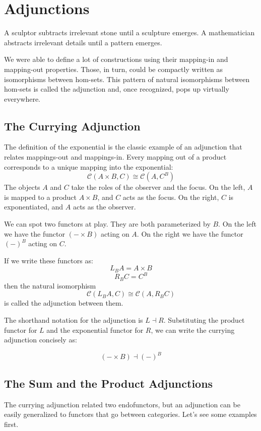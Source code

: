 \documentclass[DaoFP]{subfiles}
\begin{document}
\setcounter{chapter}{9}

\chapter{Adjunctions}

A sculptor subtracts irrelevant stone until a sculpture emerges. A mathematician abstracts irrelevant details until a pattern emerges.

We were able to define a lot of constructions using their mapping-in and mapping-out properties. Those, in turn, could be compactly written as isomorphisms between hom-sets. This pattern of natural isomorphisms between hom-sets is called the adjunction and, once recognized, pops up virtually everywhere.

\section{The Currying Adjunction}

The definition of the exponential is the classic example of an adjunction that relates mappings-out and mappings-in. Every mapping out of a product corresponds to a unique mapping into the exponential:
\[  \mathcal{C}(A \times B, C ) \cong  \mathcal{C} (A, C^B)  \]
The objects $A$ and $C$ take the roles of the observer and the focus. On the left, $A$ is mapped to a product $A \times B$, and $C$ acts as the focus. On the right, $C$ is exponentiated, and $A$ acts as the observer. 

We can spot two functors at play. They are both parameterized by $B$. On the left we have the functor $(- \times B)$ acting on $A$. On the right we have the functor $(-)^B$ acting on $C$. 

If we write these functors as:
\[ L_B A = A \times B \]
\[ R_B C = C^B \]
then the natural isomorphism
\[ \mathcal{C}(L_B A, C) \cong \mathcal{C}(A, R_B C) \]
is called the adjunction between them. 

The shorthand notation for the adjunction is $L \dashv R$. Substituting the product functor for $L$ and the exponential functor for $R$, we can write the currying adjunction concisely as:

\[ (- \times B) \dashv (-)^B \]

\section{The Sum and the Product Adjunctions}

The currying adjunction related two endofunctors, but an adjunction can be easily generalized to functors that go between categories. Let's see some examples first.
\end{document}

